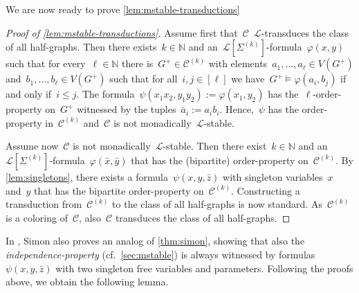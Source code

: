 \documentclass[11pt]{article}      \usepackage[margin=1in]{geometry}  \usepackage{microtype}
\theoremstyle{definition}
\newcommand{\N}[0]{\mathrm{\mathbb{N}}}
\renewcommand{\phi}{\varphi}
\newcommand{\LL}{\mathcal{L}}
\newcommand{\CC}{\mathcal{C}}
\renewcommand{\le}{\leqslant}
\renewcommand{\leq}{\le}
\begin{document}
We are now ready to prove \cref{lem:mstable-transductions}
\begin{proof}[Proof of \cref{lem:mstable-transductions}]


    Assume first that~$\CC$~$\LL$-transduces the class of all half-graphs.
    Then there exists~$k\in \N$ and an~$\LL[\Sigma^{(k)}]$-formula~$\phi(x,y)$ such that for every~$\ell \in \N$ there is~$G^+ \in \CC^{(k)}$ with elements~$a_1,\ldots,a_\ell \in V(G^+)$ and~$b_1, \ldots,b_\ell \in V(G^+)$ such that for all~$i,j \in [\ell]$ we have~$G^+ \models \phi(a_i,b_j)$ if and only if~$i \leq j$.
    The formula~$\psi(x_1 x_2, y_1 y_2) := \phi(x_1,y_2)$ has the~$\ell$-order-property on~$G^+$ witnessed by the tuples~$\bar a_i := a_i b_i$.
    Hence,~$\psi$ has the order-property in~$\CC^{(k)}$ and~$\CC$ is not monadically~$\LL$-stable.

    Assume now~$\CC$ is not monadically~$\LL$-stable.
    Then there exist~$k \in \N$ and an~$\LL[\Sigma^{(k)}]$-formula~$\phi(\bar x, \bar y)$ that has the (bipartite) order-property on~$\CC^{(k)}$.
    By \cref{lem:singletons}, there exists a formula~$\psi(x,y,\bar z)$ with singleton variables~$x$ and~$y$ that has the bipartite order-property on~$\CC^{(k)}$.
    Constructing a transduction from~$\CC^{(k)}$ to the class of all half-graphs is now standard.
    As~$\CC^{(k)}$ is a coloring of~$\CC$, also~$\CC$ transduces the class of all half-graphs.
\end{proof}

In \cite{simon2021note}, Simon also proves an analog of \cref{thm:simon}, showing that also the \emph{independence-property} (cf.\ \cref{sec:mstable}) is always witnessed by formulas~$\psi(x,y,\bar z)$ with two singleton free variables and parameters.
Following the proofs above, we obtain the following lemma.

\lemMdepTransductions*

 
\end{document}
